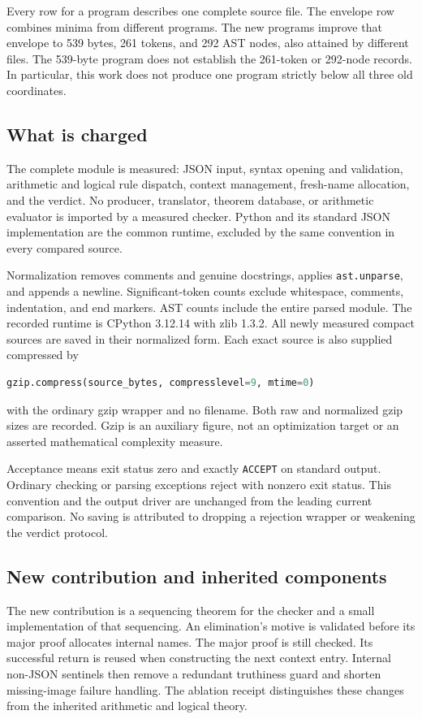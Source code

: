 Every row for a program describes one complete source file. The envelope
row combines minima from different programs. The new programs improve
that envelope to 539 bytes, 261 tokens, and 292 AST nodes, also attained
by different files. The 539-byte program does not establish the 261-token
or 292-node records. In particular, this work does not produce one
program strictly below all three old coordinates.

\subsection{What is charged}

The complete module is measured: JSON input, syntax opening and
validation, arithmetic and logical rule dispatch, context management,
fresh-name allocation, and the verdict. No producer, translator, theorem
database, or arithmetic evaluator is imported by a measured checker.
Python and its standard JSON implementation are the common runtime,
excluded by the same convention in every compared source.

Normalization removes comments and genuine docstrings, applies
\texttt{ast.unparse}, and appends a newline. Significant-token counts
exclude whitespace, comments, indentation, and end markers. AST counts
include the entire parsed module. The recorded runtime is CPython
3.12.14 with zlib 1.3.2. All newly measured compact sources are saved in
their normalized form. Each exact source is also supplied compressed by
\begin{lstlisting}[language=Python]
gzip.compress(source_bytes, compresslevel=9, mtime=0)
\end{lstlisting}
with the ordinary gzip wrapper and no filename. Both raw and normalized
gzip sizes are recorded. Gzip is an auxiliary figure, not an optimization
target or an asserted mathematical complexity measure.

Acceptance means exit status zero and exactly \texttt{ACCEPT} on standard
output. Ordinary checking or parsing exceptions reject with nonzero exit
status. This convention and the output driver are unchanged from the
leading current comparison. No saving is attributed to dropping a
rejection wrapper or weakening the verdict protocol.

\subsection{New contribution and inherited components}

The new contribution is a sequencing theorem for the checker and a
small implementation of that sequencing. An elimination's motive is
validated before its major proof allocates internal names. The major
proof is still checked. Its successful return is reused when constructing
the next context entry. Internal non-JSON sentinels then remove a
redundant truthiness guard and shorten missing-image failure handling.
The ablation receipt distinguishes these changes from the inherited
arithmetic and logical theory.

